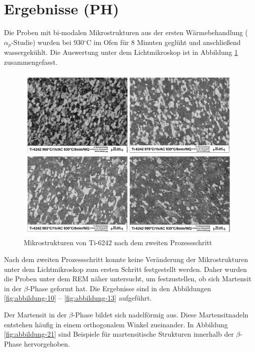 \section{Ergebnisse (PH)}

Die Proben mit bi-modalen Mikrostrukturen aus der ersten Wärmebehandlung ($\alpha_p$-Studie) wurden bei 930$^\circ$C im Ofen für 8 Minuten geglüht und anschließend wassergekühlt. Die Auswertung unter dem Lichtmikroskop ist in Abbildung \ref{fig:abbildung-9} zusammengefasst.

\begin{figure}[h]
	\centering
	\includegraphics[width=1.0\linewidth]{./Bilder/Abbildung 9.png}
	\caption[Abbildung 9]{Mikrostrukturen von Ti-6242 nach dem zweiten Prozessschritt}
	\label{fig:abbildung-9}
\end{figure}

Nach dem zweiten Prozessschritt konnte keine Veränderung der Mikrostrukturen unter dem Lichtmikroskop zum ersten Schritt festgestellt werden. Daher wurden die Proben unter dem REM näher untersucht, um festzustellen, ob sich Martensit in der $\beta$-Phase geformt hat. Die Ergebnisse sind in den Abbildungen \ref{fig:abbildung-10} -- \ref{fig:abbildung-13} aufgeführt. 

Der Martensit in der $\beta$-Phase bildet sich nadelförmig aus. Diese Martensitnadeln entstehen häufig in einem orthogonalem Winkel zueinander. In Abbildung \ref{fig:abbildung-21} sind Beispiele für martensitische Strukturen innerhalb der $\beta$-Phase hervorgehoben.


